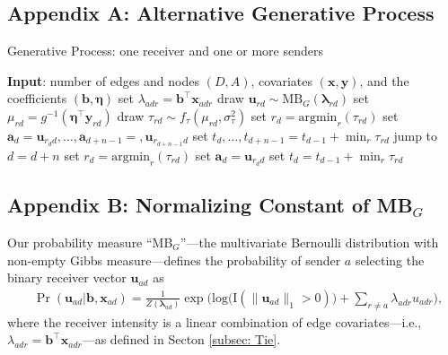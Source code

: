 \documentclass[ba]{imsart}
\numberwithin{equation}{section}
\theoremstyle{plain}
\begin{document}
	\subsection*{Appendix A: Alternative Generative Process} \label{appendix:alternativeGP}
		\begin{algorithm}[H]
			\SetAlgoLined
			\caption{Generative Process: one receiver and one or more senders}
			\begin{algorithmic}
			\STATE \textbf{Input}: number of edges and nodes $(D, A)$, covariates $(\boldsymbol{x}, \boldsymbol{y})$, and the coefficients $(\boldsymbol{b}, \boldsymbol{\eta})$
							\vskip 0.1in				
				\STATE	set $\lambda_{adr} = {\boldsymbol{b}}^{\top}\boldsymbol{x}_{adr}$
				\ENDFOR
				\STATE	draw $\boldsymbol{u}_{rd}  \sim
				\mbox{MB}_G(\boldsymbol{\lambda}_{rd})$
				\STATE		set $\mu_{rd} = g^{-1}(\boldsymbol{\eta}^\top \boldsymbol{y}_{rd})$
				\STATE		draw $\tau_{rd} \sim f_\tau(\mu_{rd}, \sigma_\tau^2)$
				\ENDFOR
				\STATE	set ${r}_d=\mbox{argmin}_{r}(\tau_{rd})$
				\STATE	set $\boldsymbol{a}_d=\boldsymbol{u}_{r_d d},\ldots,\boldsymbol{a}_{d+n-1}= ,\boldsymbol{u}_{r_{d+n-1} d}$
				\STATE	set $t_d, \ldots, t_{d+n-1}=t_{d-1} + \min_r\tau_{rd}$
				\STATE		jump to $d = d+n$
				\ELSE
				\STATE	set ${r}_d = \mbox{argmin}_{r}(\tau_{rd}) $
				\STATE	set $\boldsymbol{a}_d= \boldsymbol{u}_{r_d d}$
				\STATE	set $t_d =t_{d-1} + \min_r\tau_{rd}$
				\ENDIF
				\ENDFOR
			\end{algorithmic}
			\label{alg:generative2}
		\end{algorithm}
	\subsection*{Appendix B: Normalizing Constant of MB$_{G}$}\label{appendix: non-empty Gibbs measure}
	Our probability measure ``MB$_{G}$''---the multivariate Bernoulli distribution with non-empty Gibbs measure---defines the probability of sender $a$ selecting the binary receiver vector $\boldsymbol{u}_{ad}$ as
	\begin{equation*} 
	\begin{aligned}
	& \Pr(\boldsymbol{u}_{ad}|\boldsymbol{b}, \boldsymbol{x}_{ad}) = \frac{1}{Z(\boldsymbol{\lambda}_{ad})}\exp\Big(\mbox{log}\big(\text{I}(\lVert \boldsymbol{u}_{ad} \rVert_1 > 0)\big) + \sum_{r \neq a} \lambda_{adr}u_{adr} \Big),
	\end{aligned}
	\end{equation*}
	where the receiver intensity is a linear combination of edge covariates---i.e., $\lambda_{adr} = {\boldsymbol{b}}^{\top}\boldsymbol{x}_{adr}$---as defined in Secton \ref{subsec: Tie}.
	
\end{document}
